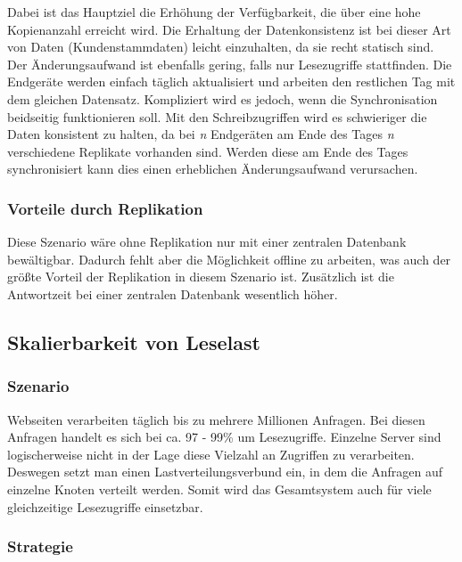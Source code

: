 Dabei ist das Hauptziel die Erhöhung der Verfügbarkeit, die über eine hohe Kopienanzahl erreicht wird. Die Erhaltung der Datenkonsistenz ist bei dieser Art von Daten (Kundenstammdaten) leicht einzuhalten, da sie recht statisch sind. Der Änderungsaufwand ist ebenfalls gering, falls nur Lesezugriffe stattfinden. Die Endgeräte werden einfach täglich aktualisiert und arbeiten den restlichen Tag mit dem gleichen Datensatz. Kompliziert wird es jedoch, wenn die Synchronisation beidseitig funktionieren soll. Mit den Schreibzugriffen wird es schwieriger die Daten konsistent zu halten, da bei \textit{n} Endgeräten am Ende des Tages \textit{n} verschiedene Replikate vorhanden sind. Werden diese am Ende des Tages synchronisiert kann dies einen erheblichen Änderungsaufwand verursachen.

\subsubsection{Vorteile durch Replikation}

Diese Szenario wäre ohne Replikation nur mit einer zentralen Datenbank bewältigbar. Dadurch fehlt aber die Möglichkeit offline zu arbeiten, was auch der größte Vorteil der Replikation in diesem Szenario ist. Zusätzlich ist die Antwortzeit bei einer zentralen Datenbank wesentlich höher. \cite{kaiserslautern}

\subsection{Skalierbarkeit von Leselast}

\subsubsection{Szenario}

Webseiten verarbeiten täglich bis zu mehrere Millionen Anfragen. Bei diesen Anfragen handelt es sich bei ca. 97 - 99\% um Lesezugriffe. \cite{kaiserslautern} Einzelne Server sind logischerweise nicht in der Lage diese Vielzahl an Zugriffen zu verarbeiten. Deswegen setzt man einen Lastverteilungsverbund ein, in dem die Anfragen auf einzelne Knoten verteilt werden. Somit wird das Gesamtsystem auch für viele gleichzeitige Lesezugriffe einsetzbar.

\subsubsection{Strategie}

